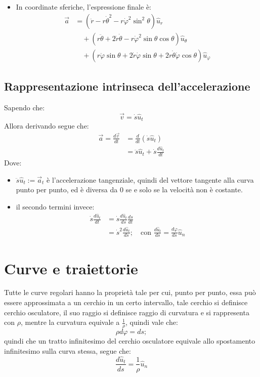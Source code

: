 \documentclass[11pt, a4paper, openright]{book}
\theoremstyle{plain}
\theoremstyle{definition}
\begin{document}
\begin{itemize}
    \item In coordinate sferiche, l'espressione finale è:
        \begin{align}
            \vec{a} & = (\ddot{r} - r\dot{\theta}^2 - r\dot{\varphi}^2\sin^2\theta)\hat{u}_r \\
            & \quad + (r\ddot{\theta} + 2\dot{r}\dot{\theta} - r\dot{\varphi}^2\sin\theta\cos\theta)\hat{u}_\theta \\
            & \quad + (r\ddot{\varphi}\sin\theta + 2\dot{r}\dot{\varphi}\sin\theta + 2r\dot{\theta}\dot{\varphi}\cos\theta)\hat{u}_\varphi
        \end{align}
\end{itemize}
\subsection{Rappresentazione intrinseca dell'accelerazione}
Sapendo che:
\[\vec{v} = \dot{s}\hat{u}_t\]
Allora derivando segue che:
\begin{align}
    \vec{a} = \frac{d\vec{v}}{dt} & = \frac{d}{dt}(\dot{s}\hat{u}_t) \\
    & = \ddot{s}\hat{u}_t + \dot{s}\frac{d\hat{u}_t}{dt}
\end{align}
Dove:
\begin{itemize}
    \item $\ddot{s}\hat{u}_t:= \vec{a}_t$ è l'accelerazione tangenziale, quindi del vettore tangente alla curva punto per punto, ed è diversa da 0 se e solo se la velocità non è costante.
    \item il secondo termini invece:
    \begin{align}
        \dot{s}\frac{d\hat{u}_t}{dt} & = \dot{s}\frac{d\hat{u}_t}{ds}\frac{ds}{dt} \\
        & = \dot{s}^2\frac{d\hat{u}_t}{ds}; \quad \text{con } \frac{d\hat{u}_t}{ds} = \frac{d\varphi}{ds}\hat{u}_n
    \end{align}
\end{itemize}

\section{Curve e traiettorie}
Tutte le curve regolari hanno la proprietà tale per cui, punto per punto, essa può essere approssimata a un cerchio in un certo intervallo, tale cerchio si definisce cerchio osculatore, il suo raggio si definisce raggio di curvatura e si rappresenta con $\rho$, mentre la curvatura equivale a $\frac{1}{\rho}$, quindi vale che:
\[\rho d\varphi = ds;\]
quindi che un tratto infinitesimo del cerchio osculatore equivale allo spostamento infinitesimo sulla curva stessa, segue che:
\[\frac{d\hat{u}_t}{ds} = \frac{1}{\rho}\hat{u}_n\]
\end{document}
